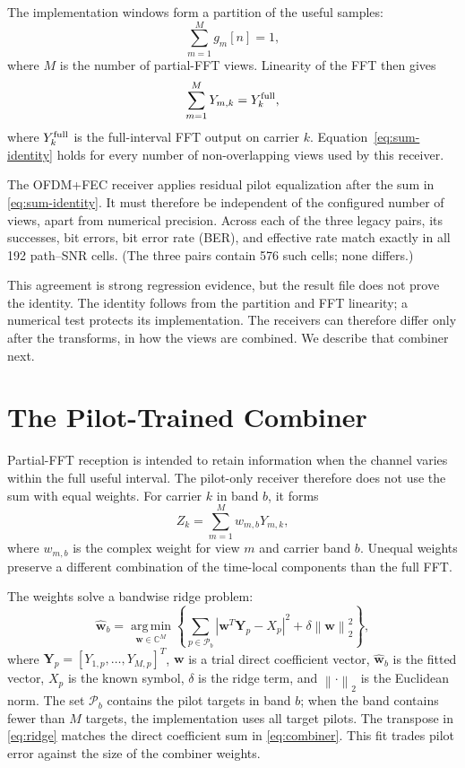 \documentclass[11pt]{article}
\newcommand{\C}{\mathbb C}
\newcommand{\norm}[1]{\left\lVert #1\right\rVert}
\begin{document}
The implementation windows form a partition of the useful samples:
\begin{equation}
  \sum_{m=1}^{M}g_m[n]=1,
  \label{eq:partition}
\end{equation}
where $M$ is the number of partial-FFT views.  Linearity of the FFT then gives
\begin{equation}
  \sum_{m=1}^{M}Y_{m,k}=Y_k^{\rm full},
  \label{eq:sum-identity}
\end{equation}
where $Y_k^{\rm full}$ is the full-interval FFT output on carrier $k$.
Equation~\eqref{eq:sum-identity} holds for every number of non-overlapping
views used by this receiver.

The OFDM+FEC receiver applies residual pilot equalization after the sum in
\eqref{eq:sum-identity}.  It must therefore be independent of the configured
number of views, apart from numerical precision.  Across each of the three
legacy pairs, its successes, bit errors, bit error rate (BER), and effective
rate match exactly in all 192 path--SNR cells.  (The three pairs contain 576
such cells; none differs.)

This agreement is strong regression evidence, but the result file does not
prove the identity.  The identity follows from the partition and FFT
linearity; a numerical test protects its implementation.  The receivers can
therefore differ only after the transforms, in how the views are combined.
We describe that combiner next.

\section{The Pilot-Trained Combiner}

Partial-FFT reception is intended to retain information when the channel
varies within the full useful interval.  The pilot-only receiver therefore
does not use the sum with equal weights.  For carrier $k$ in band $b$, it
forms
\begin{equation}
  Z_k
  =
  \sum_{m=1}^{M}w_{m,b}Y_{m,k},
  \label{eq:combiner}
\end{equation}
where $w_{m,b}$ is the complex weight for view $m$ and carrier band $b$.
Unequal weights preserve a different combination of the time-local
components than the full FFT.

The weights solve a bandwise ridge problem:
\begin{equation}
  \widehat{\bm w}_b
  =
  \underset{\bm w\in\C^M}{\operatorname{arg\,min}}
  \left\{
  \sum_{p\in\mathcal P_b}
  \left|\bm w^{T}\bm Y_p-X_p\right|^2
  +\delta\norm{\bm w}_2^2
  \right\},
  \label{eq:ridge}
\end{equation}
where $\bm Y_p=[Y_{1,p},\ldots,Y_{M,p}]^T$, $\bm w$ is a trial direct
coefficient vector, $\widehat{\bm w}_b$ is the fitted vector, $X_p$ is the
known symbol, $\delta$ is the ridge term, and $\norm{\cdot}_2$ is the
Euclidean norm.  The set $\mathcal P_b$ contains the pilot targets in band
$b$; when the band contains fewer than $M$ targets, the implementation uses
all target pilots.  The transpose in \eqref{eq:ridge} matches the direct
coefficient sum in \eqref{eq:combiner}.  This fit trades pilot error against
the size of the combiner weights.
\end{document}
